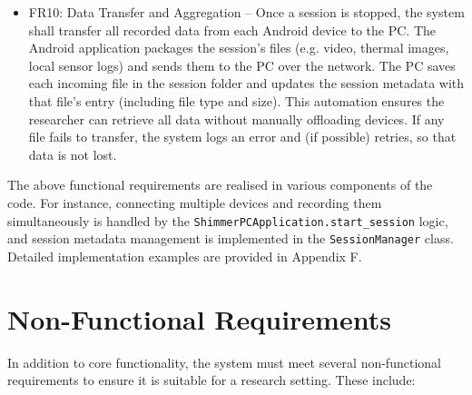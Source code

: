\begin{itemize}
    \item FR10: Data Transfer and Aggregation -- Once a session is stopped, the system shall transfer all recorded data from each Android device to the PC. The Android application packages the session's files (e.g. video, thermal images, local sensor logs) and sends them to the PC over the network. The PC saves each incoming file in the session folder and updates the session metadata with that file's entry (including file type and size). This automation ensures the researcher can retrieve all data without manually offloading devices. If any file fails to transfer, the system logs an error and (if possible) retries, so that data is not lost.
\end{itemize}

The above functional requirements are realised in various components of the code. For instance, connecting multiple devices and recording them simultaneously is handled by the \texttt{ShimmerPCApplication.start\_session} logic, and session metadata management is implemented in the \texttt{SessionManager} class. Detailed implementation examples are provided in Appendix F.


\section{Non-Functional Requirements}
In addition to core functionality, the system must meet several non-functional requirements to ensure it is suitable for a research setting. These include:

